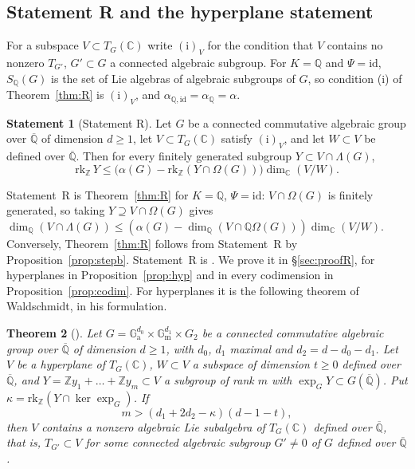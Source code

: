 \documentclass[11pt]{amsart}
\newtheorem{theorem}{Theorem}[section]
\theoremstyle{definition}
\newtheorem{statement}[theorem]{Statement}
\newcommand{\Qb}{\overline{\mathbb{Q}}}
\newcommand{\C}{\mathbb{C}}
\newcommand{\Q}{\mathbb{Q}}
\newcommand{\Z}{\mathbb{Z}}
\newcommand{\Ga}{\mathbb{G}_{\mathrm a}}
\newcommand{\Gm}{\mathbb{G}_{\mathrm m}}
\begin{document}
\subsection{Statement R and the hyperplane statement}\label{sec:stmtR}
For a subspace $V\subset T_G(\C)$ write $(\mathrm i)_V$ for the condition that $V$ contains no nonzero $T_{G'}$, $G'\subset G$
a connected algebraic subgroup. For $K=\Q$ and $\Psi=\mathrm{id}$, $S_\Q(G)$ is the set of Lie algebras of algebraic
subgroups of $G$, so condition (i) of Theorem~\ref{thm:R} is $(\mathrm i)_V$, and $\alpha_{\Q,\mathrm{id}}=\alpha_\Q=\alpha$.

\begin{statement}[Statement R]\label{stmt:R}
Let $G$ be a connected commutative algebraic group over $\Qb$ of dimension $d\ge1$, let $V\subset T_G(\C)$ satisfy
$(\mathrm i)_V$, and let $W\subset V$ be defined over $\Qb$. Then for every finitely generated subgroup
$Y\subset V\cap\Lambda(G)$,
\[
\mathrm{rk}_\Z\,Y\le\bigl(\alpha(G)-\mathrm{rk}_\Z(Y\cap\Omega(G))\bigr)\dim_\C(V/W).
\]
\end{statement}

\noindent Statement~R is Theorem~\ref{thm:R} for $K=\Q$, $\Psi=\mathrm{id}$: $V\cap\Omega(G)$ is finitely generated, so taking
$Y\supseteq V\cap\Omega(G)$ gives $\dim_\Q(V\cap\Lambda(G))\le(\alpha(G)-\dim_\Q(V\cap\Q\Omega(G)))\dim_\C(V/W)$. Conversely,
Theorem~\ref{thm:R} follows from Statement~R by Proposition~\ref{prop:stepb}. Statement~R is \cite[proof, step (a),
p.~363]{RW93}. We prove it in \S\ref{sec:proofR}, for hyperplanes in Proposition~\ref{prop:hyp} and in every codimension in
Proposition~\ref{prop:codim}. For hyperplanes it is the following theorem of Waldschmidt, in his formulation.

\begin{theorem}[{\cite[Thm.~1.1, pp.~375--376, under (5.4) of \S5d, p.~394]{W88}}]\label{thm:W88k}
Let $G=\Ga^{d_0}\times\Gm^{d_1}\times G_2$ be a connected commutative algebraic group over $\Qb$ of dimension $d\ge1$, with
$d_0$, $d_1$ maximal and $d_2=d-d_0-d_1$. Let $V$ be a hyperplane of $T_G(\C)$, $W\subset V$ a subspace of dimension
$t\ge0$ defined over $\Qb$, and $Y=\Z y_1+\dots+\Z y_m\subset V$ a subgroup of rank $m$ with $\exp_GY\subset G(\Qb)$. Put
$\kappa=\mathrm{rk}_\Z(Y\cap\ker\exp_G)$. If
\[
m>(d_1+2d_2-\kappa)(d-1-t),\tag{5.4}
\]
then $V$ contains a nonzero algebraic Lie subalgebra of $T_G(\C)$ defined over $\Qb$, that is, $T_{G'}\subset V$ for some
connected algebraic subgroup $G'\ne0$ of $G$ defined over $\Qb$.
\end{theorem}
\end{document}

